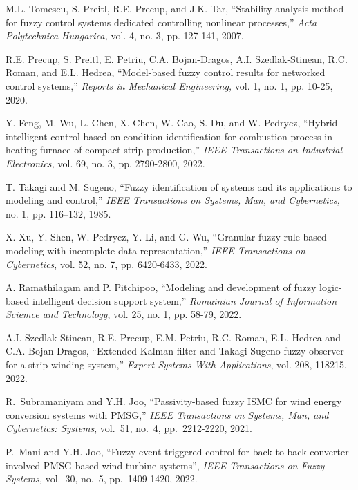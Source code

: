 \documentclass[preprint,11pt]{elsarticle}
\begin{document}
\begin{thebibliography}{00}
{M.L. Tomescu,  S. Preitl, R.E. Precup, and J.K. Tar, ``Stability analysis method for fuzzy control systems dedicated controlling nonlinear processes,'' {\em Acta Polytechnica Hungarica,} vol. 4, no. 3, pp. 127-141, 2007.}

{R.E. Precup, S. Preitl, E. Petriu, C.A. Bojan-Dragos, A.I. Szedlak-Stinean, R.C. Roman, and E.L. Hedrea, ``Model-based fuzzy control results for networked control systems,'' {\em  Reports in Mechanical Engineering,} vol. 1, no. 1, pp. 10-25, 2020.}

{Y. Feng, M. Wu, L. Chen, X. Chen, W. Cao, S. Du, and W. Pedrycz, ``Hybrid intelligent control based on condition identification for combustion process in heating furnace of compact strip production,'' {\em  IEEE Transactions on Industrial Electronics,} vol. 69, no. 3, pp. 2790-2800, 2022.}

T. Takagi and M. Sugeno, ``Fuzzy identification of systems and its applications to modeling and control,'' {\em IEEE Transactions on Systems, Man, and Cybernetics,} no. 1, pp. 116–132, 1985.

{X. Xu, Y. Shen, W. Pedrycz, Y. Li, and G. Wu, ``Granular fuzzy rule-based modeling with incomplete data representation,'' {\em IEEE Transactions on Cybernetics}, vol. 52, no. 7, pp. 6420-6433, 2022.}

{A. Ramathilagam  and P. Pitchipoo, ``Modeling and development of fuzzy logic-based intelligent decision support system,'' {\em Romainian Journal of Information Sciemce and Technology}, vol. 25, no. 1, pp. 58-79, 2022.}

{A.I. Szedlak-Stinean, R.E. Precup, E.M. Petriu, R.C. Roman, E.L. Hedrea  and C.A. Bojan-Dragos, ``Extended Kalman filter and Takagi-Sugeno fuzzy observer for a strip winding system,'' {\em Expert Systems With Applications}, vol. 208, 118215, 2022.}







R.~Subramaniyam and Y.H. Joo, ``Passivity-based fuzzy ISMC for wind energy conversion systems with PMSG,'' {\em  IEEE Transactions on Systems, Man, and Cybernetics: Systems}, vol.~51, no.~4, pp.~2212-2220, 2021.

P.~Mani and Y.H. Joo, ``Fuzzy event-triggered control for back to back converter involved PMSG-based wind turbine systems'', {\em  IEEE Transactions on Fuzzy Systems,} vol.~30, no.~5, pp.~1409-1420, 2022.


\end{thebibliography}
\end{document}
